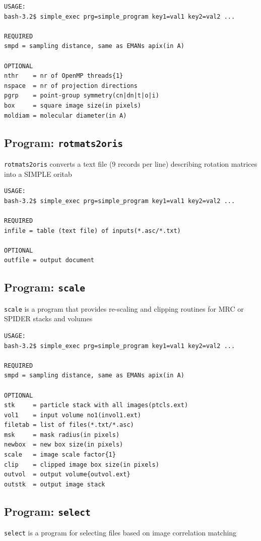 \documentclass[a4paper,11pt]{article}
\newcommand{\prgname}[1]{\textcolor{NavyBlue}{\texttt{#1}}}
\begin{document}
\begin{verbatim}
USAGE:
bash-3.2$ simple_exec prg=simple_program key1=val1 key2=val2 ...

REQUIRED
smpd = sampling distance, same as EMANs apix(in A)

OPTIONAL
nthr    = nr of OpenMP threads{1}
nspace  = nr of projection directions
pgrp    = point-group symmetry(cn|dn|t|o|i)
box     = square image size(in pixels)
moldiam = molecular diameter(in A)
\end{verbatim}

\subsection{Program: \prgname{rotmats2oris}}
\label{rotmats2oris}
\prgname{rotmats2oris} converts a text file (9 records per line) describing rotation matrices into a SIMPLE oritab

\begin{verbatim}
USAGE:
bash-3.2$ simple_exec prg=simple_program key1=val1 key2=val2 ...

REQUIRED
infile = table (text file) of inputs(*.asc/*.txt)

OPTIONAL
outfile = output document
\end{verbatim}

\subsection{Program: \prgname{scale}}
\label{scale}
\prgname{scale} is a program that provides re-scaling and clipping routines for MRC or SPIDER stacks and volumes

\begin{verbatim}
USAGE:
bash-3.2$ simple_exec prg=simple_program key1=val1 key2=val2 ...

REQUIRED
smpd = sampling distance, same as EMANs apix(in A)

OPTIONAL
stk     = particle stack with all images(ptcls.ext)
vol1    = input volume no1(invol1.ext)
filetab = list of files(*.txt/*.asc)
msk     = mask radius(in pixels)
newbox  = new box size(in pixels)
scale   = image scale factor{1}
clip    = clipped image box size(in pixels)
outvol  = output volume{outvol.ext}
outstk  = output image stack
\end{verbatim}

\subsection{Program: \prgname{select}}
\label{select}
\prgname{select} is a program for selecting files based on image correlation matching
\end{document}
